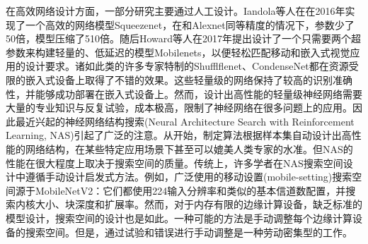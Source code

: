 在高效网络设计方面，一部分研究主要通过人工设计\cite{zhang2018shufflenet,huang2018condensenet,howard2017mobilenets,iandola2016squeezenet}。Iandola等人在在2016年实现了一个高效的网络模型Squeezenet\cite{iandola2016squeezenet}，在和Alexnet同等精度的情况下，参数少了50倍，模型压缩了510倍。随后Howard等人在2017年提出设计了一个只需要两个超参数来构建轻量的、低延迟的模型Mobilenets\cite{howard2017mobilenets}，以便轻松匹配移动和嵌入式视觉应用的设计要求。诸如此类的许多专家特制的Shufflflenet、CondenseNet\cite{zhang2018shufflenet,huang2018condensenet}都在资源受限的嵌入式设备上取得了不错的效果。这些轻量级的网络保持了较高的识别准确性，并能够成功部署在嵌入式设备上。然而，设计出高性能的轻量级神经网络需要大量的专业知识与反复试验，成本极高，限制了神经网络在很多问题上的应用。因此最近兴起的神经网络结构搜索(Neural Architecture Search with Reinforcement Learning, NAS)引起了广泛的注意。从\cite{cai2018efficient,wu2019fbnet}开始，制定算法根据样本集自动设计出高性能的网络结构，在某些特定应用场景下甚至可以媲美人类专家的水准。但NAS的性能在很大程度上取决于搜索空间的质量\cite{radosavovic2020designing}。传统上，许多学者在NAS搜索空间设计中遵循手动设计启发式方法。例如，广泛使用的移动设置(mobile-setting)搜索空间\cite{canziani2016analysis}源于MobileNetV2\cite{tan2019mnasnet}：它们都使用224输入分辨率和类似的基本信道数配置，并搜索内核大小、块深度和扩展率。然而，对于内存有限的边缘计算设备，缺乏标准的模型设计，搜索空间的设计也是如此。一种可能的方法是手动调整每个边缘计算设备的搜索空间。但是，通过试验和错误进行手动调整是一种劳动密集型的工作。


